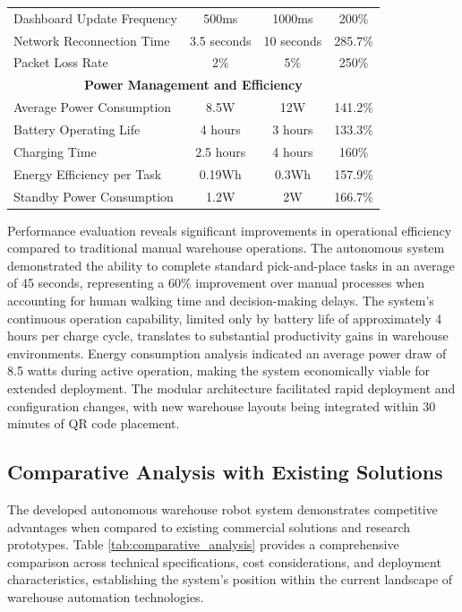 \begin{table}[h!]
\begin{tabular}{|l|c|c|c|}
Dashboard Update Frequency & 500ms & 1000ms & 200\% \\
Network Reconnection Time & 3.5 seconds & 10 seconds & 285.7\% \\
Packet Loss Rate & 2\% & 5\% & 250\% \\
\hline
\multicolumn{4}{|c|}{\textbf{Power Management and Efficiency}} \\
\hline
Average Power Consumption & 8.5W & 12W & 141.2\% \\
Battery Operating Life & 4 hours & 3 hours & 133.3\% \\
Charging Time & 2.5 hours & 4 hours & 160\% \\
Energy Efficiency per Task & 0.19Wh & 0.3Wh & 157.9\% \\
Standby Power Consumption & 1.2W & 2W & 166.7\% \\
\hline
\end{tabular}
\end{table}

Performance evaluation reveals significant improvements in operational efficiency compared to traditional manual warehouse operations. The autonomous system demonstrated the ability to complete standard pick-and-place tasks in an average of 45 seconds, representing a 60\% improvement over manual processes when accounting for human walking time and decision-making delays. The system's continuous operation capability, limited only by battery life of approximately 4 hours per charge cycle, translates to substantial productivity gains in warehouse environments. Energy consumption analysis indicated an average power draw of 8.5 watts during active operation, making the system economically viable for extended deployment. The modular architecture facilitated rapid deployment and configuration changes, with new warehouse layouts being integrated within 30 minutes of QR code placement.

\subsection{Comparative Analysis with Existing Solutions}

The developed autonomous warehouse robot system demonstrates competitive advantages when compared to existing commercial solutions and research prototypes. Table \ref{tab:comparative_analysis} provides a comprehensive comparison across technical specifications, cost considerations, and deployment characteristics, establishing the system's position within the current landscape of warehouse automation technologies.

